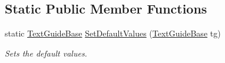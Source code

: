 \subsection*{Static Public Member Functions}
\begin{DoxyCompactItemize}
\item 
static \hyperlink{class_lerp2_a_p_i_1_1_effects_1_1___text_1_1_text_guide_base}{Text\+Guide\+Base} \hyperlink{class_lerp2_a_p_i_1_1_effects_1_1___text_1_1_text_guide_base_a2f9dcab0faf97e2a6da95ee1b8d26d6d}{Set\+Default\+Values} (\hyperlink{class_lerp2_a_p_i_1_1_effects_1_1___text_1_1_text_guide_base}{Text\+Guide\+Base} tg)
\begin{DoxyCompactList}\small\item\em Sets the default values. \end{DoxyCompactList}\end{DoxyCompactItemize}
